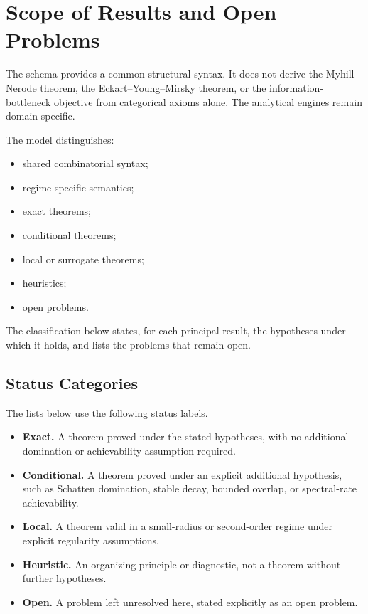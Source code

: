 \documentclass[12pt]{article}
\theoremstyle{definition}
\begin{document}
\section{Scope of Results and Open Problems}
\label{sec:epistemic}

The schema provides a common structural syntax.  It does not derive the
Myhill--Nerode theorem, the Eckart--Young--Mirsky theorem, or the
information-bottleneck objective from categorical axioms alone.  The
analytical engines remain domain-specific.

The model distinguishes:
\begin{itemize}[leftmargin=1.6em]
\item shared combinatorial syntax;
\item regime-specific semantics;
\item exact theorems;
\item conditional theorems;
\item local or surrogate theorems;
\item heuristics;
\item open problems.
\end{itemize}

The classification below states, for each principal result, the hypotheses
under which it holds, and lists the problems that remain open.

\subsection{Status Categories}
\label{subsec:status-categories}

The lists below use the following status labels.

\begin{itemize}[leftmargin=1.6em]
\item \textbf{Exact.}
A theorem proved under the stated hypotheses, with no additional domination
or achievability assumption required.

\item \textbf{Conditional.}
A theorem proved under an explicit additional hypothesis, such as Schatten
domination, stable decay, bounded overlap, or spectral-rate achievability.

\item \textbf{Local.}
A theorem valid in a small-radius or second-order regime under explicit
regularity assumptions.

\item \textbf{Heuristic.}
An organizing principle or diagnostic, not a theorem without further
hypotheses.

\item \textbf{Open.}
A problem left unresolved here, stated explicitly as an open problem.
\end{itemize}
\end{document}
